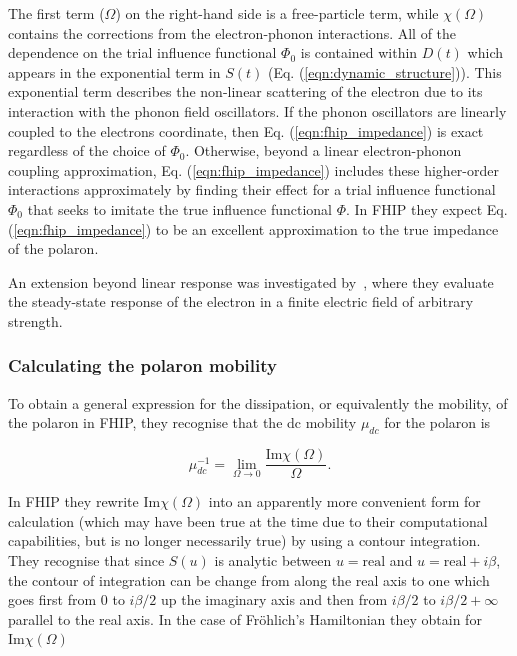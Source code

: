 The first term ($\Omega$) on the right-hand side is a free-particle term, while $\chi(\Omega)$ contains the corrections from the electron-phonon interactions. All of the dependence on the trial influence functional $\Phi_0$ is contained within $D(t)$ which appears in the exponential term in $S(t)$ (Eq. (\ref{eqn:dynamic_structure})). This exponential term describes the non-linear scattering of the electron due to its interaction with the phonon field oscillators. If the phonon oscillators are linearly coupled to the electrons coordinate, then Eq. (\ref{eqn:fhip_impedance}) is exact regardless of the choice of $\Phi_0$. Otherwise, beyond a linear electron-phonon coupling approximation, Eq. (\ref{eqn:fhip_impedance}) includes these higher-order interactions approximately by finding their effect for a trial influence functional $\Phi_0$ that seeks to imitate the true influence functional $\Phi$. In FHIP they expect Eq. (\ref{eqn:fhip_impedance}) to be an excellent approximation to the true impedance of the polaron. 

An extension beyond linear response was investigated by~\cite{thornber_velocity_1970}, where they evaluate the steady-state response of the electron in a finite electric field of arbitrary strength.

\subsubsection{Calculating the polaron mobility}
\label{subsubsec:2-3-1-4}

To obtain a general expression for the dissipation, or equivalently the mobility, of the polaron in FHIP, they recognise that the dc mobility $\mu_{dc}$ for the polaron is

\begin{equation}\label{eqn:FHIP_mobility}
    \mu^{-1}_{dc} = \lim_{\Omega \rightarrow 0} \frac{\textrm{Im}\chi(\Omega)}{\Omega}.
\end{equation}

In FHIP they rewrite $\text{Im} \chi(\Omega)$ into an apparently more convenient form for calculation (which may have been true at the time due to their computational capabilities, but is no longer necessarily true) by using a contour integration. They recognise that since $S(u)$ is analytic between $u = \text{real}$ and $u = \text{real} + i\beta$, the contour of integration can be change from along the real axis to one which goes first from $0$ to $i\beta/2$ up the imaginary axis and then from $i\beta/2$ to $i\beta/2 + \infty$ parallel to the real axis. In the case of Fr\"ohlich's Hamiltonian they obtain for $\textrm{Im}\chi(\Omega)$

